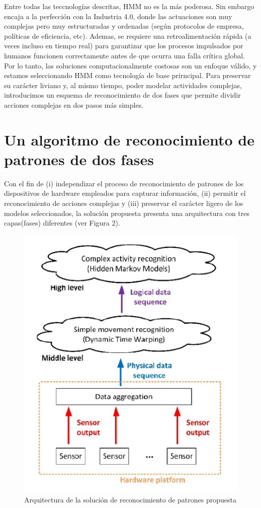 \documentclass{article}
\begin{document}
Entre todas las teccnologías descritas, HMM no es la más poderosa. Sin embargo encaja a la perfección con la Industria 4.0, donde las actuaciones son muy complejas pero muy estructuradas y ordenadas (según protocolos de empresa, políticas de eficiencia, etc). Ademas, se requiere una retroalimentación rápida (a veces incluso en tiempo real) para garantizar que los procesos impulsados por humanos funcionen correctamente antes de que ocurra una falla crítica global. Por lo tanto, las soluciones computacionalmente costosas son un enfoque válido, y estamos seleccionando HMM como tecnología de base prirncipal. Para preservar su carácter liviano y, al mismo tiempo, poder modelar actividades complejas, introducimos un esquema de reconocimiento de dos fases que permite dividir acciones complejas en dos pasos más simples.


\section{Un algoritmo de reconocimiento de patrones de dos fases}

Con el fin de (i) independizar el proceso de reconocimiento de patrones de los dispositivos de hardware empleados para capturar información, (ii) permitir el reconocimiento de acciones complejas y (iii) preservar el carácter ligero de los modelos seleccionados, la solución propuesta presenta una arquitectura con tres capas(fases) diferentes (ver Figura 2). \\
\begin{figure}[H]
  \centering
  \includegraphics[scale=0.65]{foto2.png}
  \caption{
Arquitectura de la solución de reconocimiento de patrones propuesta}
\end{figure}
\end{document}
